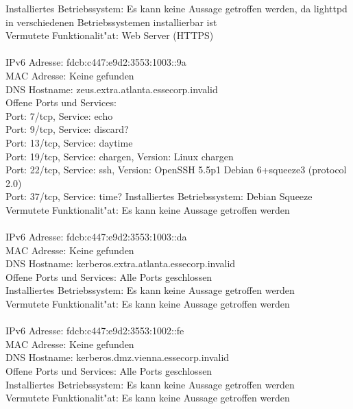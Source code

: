 \documentclass[12pt,a4paper,titlepage,oneside]{scrartcl}
\begin{document}
Installiertes Betriebssystem: Es kann keine Aussage getroffen werden, da lighttpd in verschiedenen Betriebssystemen installierbar ist\\
Vermutete Funktionalit"at: Web Server (HTTPS)\\
\\
IPv6 Adresse: fdcb:c447:e9d2:3553:1003::9a\\
MAC Adresse: Keine gefunden\\
DNS Hostname: zeus.extra.atlanta.essecorp.invalid\\
Offene Ports und Services:\\
Port: 7/tcp, Service: echo\\
Port: 9/tcp, Service: discard?\\
Port: 13/tcp, Service: daytime\\
Port: 19/tcp, Service: chargen, Version: Linux chargen\\
Port: 22/tcp, Service: ssh, Version: OpenSSH 5.5p1 Debian 6+squeeze3 (protocol 2.0)\\
Port: 37/tcp, Service: time?
Installiertes Betriebssystem: Debian Squeeze\\
Vermutete Funktionalit"at: Es kann keine Aussage getroffen werden\\
\\
IPv6 Adresse: fdcb:c447:e9d2:3553:1003::da\\
MAC Adresse: Keine gefunden\\
DNS Hostname: kerberos.extra.atlanta.essecorp.invalid\\
Offene Ports und Services: Alle Ports geschlossen\\
Installiertes Betriebssystem: Es kann keine Aussage getroffen werden\\
Vermutete Funktionalit"at: Es kann keine Aussage getroffen werden\\
\\
IPv6 Adresse: fdcb:c447:e9d2:3553:1002::fe\\
MAC Adresse: Keine gefunden\\
DNS Hostname: kerberos.dmz.vienna.essecorp.invalid\\
Offene Ports und Services: Alle Ports geschlossen\\
Installiertes Betriebssystem: Es kann keine Aussage getroffen werden\\
Vermutete Funktionalit"at: Es kann keine Aussage getroffen werden\\
\end{document}

